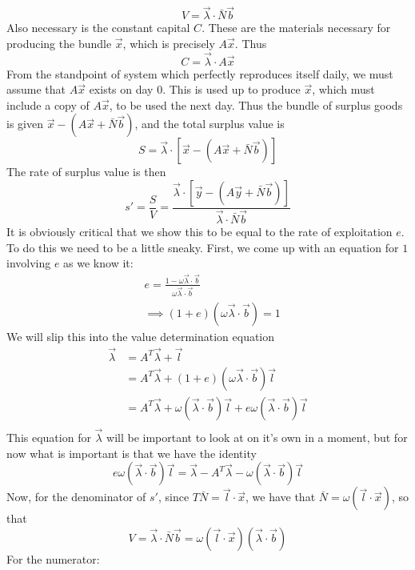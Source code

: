 \[ V = \vec{\lambda} \cdot \bar{N}\vec{b} \]  
Also necessary is the constant capital $C$. These are the materials necessary for producing the bundle $\vec{x}$, which is precisely $A\vec{x}$. Thus
\[ C = \vec{\lambda} \cdot A\vec{x} \]
From the standpoint of system which perfectly reproduces itself daily, we must assume that $A\vec{x}$ exists on day $0$. This is used up to produce $\vec{x}$, which must include a copy of $A\vec{x}$, to be used the next day. Thus the bundle of surplus goods is given $\vec{x} - (A\vec{x} + \bar{N}\vec{b})$, and the total surplus value is
\[ S = \vec{\lambda}\cdot [\vec{x} - (A\vec{x} + \bar{N}\vec{b})] \]
The rate of surplus value is then
\[ s' = \frac{S}{V} = \frac{\vec{\lambda}\cdot [\vec{y} - (A\vec{y} + \bar{N}\vec{b})]}{\vec{\lambda} \cdot \bar{N}\vec{b}} \] 
It is obviously critical that we show this to be equal to the rate of exploitation $e$. To do this we need to be a little sneaky. First, we come up with an equation for $1$ involving $e$ as we know it:
\begin{align*}
	& e = \frac{1-\omega\vec{\lambda}\cdot \vec{b}}{\omega\vec{\lambda}\cdot \vec{b}}\\
	&\implies (1+e)(\omega\vec{\lambda}\cdot \vec{b}) = 1
\end{align*}
We will slip this into the value determination equation
\begin{align*}
	\vec{\lambda} &= A^T\vec{\lambda} + \vec{l} \\
	&= A^T\vec{\lambda} + (1+e)(\omega\vec{\lambda}\cdot \vec{b})\vec{l} \\
	&= A^T\vec{\lambda} + \omega(\vec{\lambda}\cdot\vec{b})\vec{l} + e\omega(\vec{\lambda}\cdot\vec{b})\vec{l} \\
\end{align*}
This equation for $\vec{\lambda}$ will be important to look at on it's own in a moment, but for now what is important is that we have the identity
\[ e\omega(\vec{\lambda}\cdot\vec{b})\vec{l} = \vec{\lambda} - A^T\vec{\lambda} - \omega(\vec{\lambda}\cdot\vec{b})\vec{l} \]
Now, for the denominator of $s'$, since $T\bar{N} = \vec{l}\cdot \vec{x}$, we have that $\bar{N} = \omega (\vec{l} \cdot \vec{x})$, so that 
\[ V = \vec{\lambda} \cdot \bar{N}\vec{b} = \omega (\vec{l} \cdot \vec{x})(\vec{\lambda} \cdot \vec{b}) \]
For the numerator:
